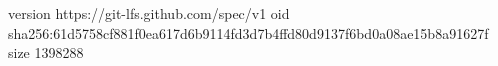 version https://git-lfs.github.com/spec/v1
oid sha256:61d5758cf881f0ea617d6b9114fd3d7b4ffd80d9137f6bd0a08ae15b8a91627f
size 1398288
